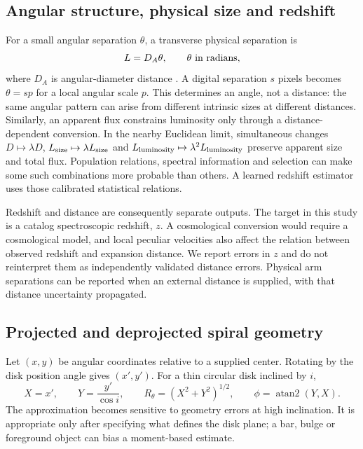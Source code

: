 \documentclass[11pt]{article}
\begin{document}
\subsection{Angular structure, physical size and redshift}
For a small angular separation $\theta$, a transverse physical separation is
\begin{equation}
 L=D_A\theta, \qquad \theta\ \hbox{in radians},
 \label{eq:angular}
\end{equation}
where $D_A$ is angular-diameter distance \citep{hogg1999}. A digital separation
$s$ pixels becomes $\theta=sp$ for a local angular scale $p$. This determines an
angle, not a distance: the same angular pattern can arise from different
intrinsic sizes at different distances. Similarly, an apparent flux constrains
luminosity only through a distance-dependent conversion. In the nearby Euclidean
limit, simultaneous changes $D\mapsto\lambda D$, $L_{\rm size}\mapsto\lambda
L_{\rm size}$ and $L_{\rm luminosity}\mapsto\lambda^2L_{\rm luminosity}$ preserve
apparent size and total flux. Population relations, spectral information and
selection can make some such combinations more probable than others. A learned
redshift estimator uses those calibrated statistical relations.

Redshift and distance are consequently separate outputs. The target in this
study is a catalog spectroscopic redshift, $z$. A cosmological conversion would
require a cosmological model, and local peculiar velocities also affect the
relation between observed redshift and expansion distance. We report errors in
$z$ and do not reinterpret them as independently validated distance errors.
Physical arm separations can be reported when an external distance is supplied,
with that distance uncertainty propagated.

\subsection{Projected and deprojected spiral geometry}
Let $(x,y)$ be angular coordinates relative to a supplied center. Rotating by the
disk position angle gives $(x',y')$. For a thin circular disk inclined by $i$,
\begin{equation}
 X=x',\qquad Y=\frac{y'}{\cos i},\qquad
 R_\theta=(X^2+Y^2)^{1/2},\qquad \phi=\operatorname{atan2}(Y,X).
 \label{eq:deproject}
\end{equation}
The approximation becomes sensitive to geometry errors at high inclination.
It is appropriate only after specifying what defines the disk plane; a bar,
bulge or foreground object can bias a moment-based estimate.
\end{document}
